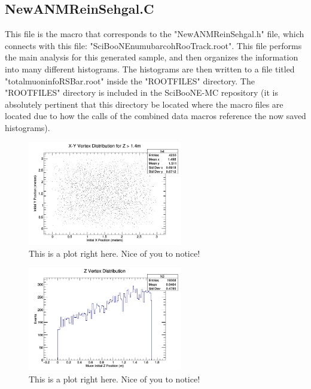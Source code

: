 \documentclass[11pt]{article}
\begin{document}
\subsection{NewANMReinSehgal.C}
This file is the macro that corresponds to the "NewANMReinSehgal.h" file, which connects with this file: "SciBooNE\textunderscore numubar\textunderscore coh\textunderscore RooTrack.root". This file performs the main analysis for this generated sample, and then organizes the information into many different histograms. The histograms are then written to a file titled "totalmuoninfoRSBar.root" inside the "ROOTFILES" directory. The "ROOTFILES" directory is included in the SciBooNE-MC repository (it is absolutely pertinent that this directory be located where the macro files are located due to how the calls of the combined data macros reference the now saved histograms).

\begin{figure}[H]
\centering
\includegraphics[width=0.6\textwidth]{NewANMReinSehgalImages/1-X-YVertexDistributionANMRS.png}
\caption{This is a plot right here. Nice of you to notice!}
\end{figure}

\begin{figure}[H]
\centering
\includegraphics[width=0.6\textwidth]{NewANMReinSehgalImages/2-ZVertexDistributionANMRS.png}
\caption{This is a plot right here. Nice of you to notice!}
\end{figure}
\end{document}

